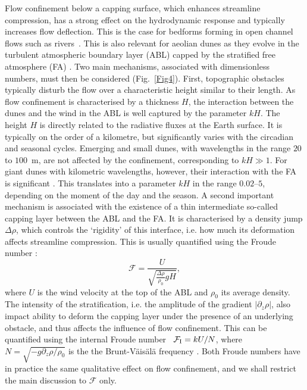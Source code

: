 Flow confinement below a capping surface, which enhances streamline compression, has a strong effect on the hydrodynamic response and typically increases flow deflection. This is the case for bedforms forming in open channel flows such as rivers~\citep{Fourriere2010, Unsworth2018}. This is also relevant for aeolian dunes as they evolve in the turbulent atmospheric boundary layer (ABL) capped by the stratified free atmosphere (FA) \citep{andreotti2009}. Two main mechanisms, associated with dimensionless numbers, must then be considered (Fig.~\ref{Fig4}). First, topographic obstacles typically disturb the flow over a characteristic height similar to their length. As flow confinement is characterised by a thickness $H$, the interaction between the dunes and the wind in the ABL is well captured by the parameter $k H$. The height $H$ is directly related to the radiative fluxes at the Earth surface. It is typically on the order of a kilometre, but significantly varies with the circadian and seasonal cycles. Emerging and small dunes, with wavelengths in the range $20$ to $100$~m, are not affected by the confinement, corresponding to $k H \gg 1$. For giant dunes with kilometric wavelengths, however, their interaction with the FA is significant \citep{andreotti2009}. This translates into a parameter $kH$ in the range $0.02$--$5$, depending on the moment of the day and the season. A second important mechanism is associated with the existence of a thin intermediate so-called capping layer between the ABL and the FA. It is characterised by a density jump $\Delta\rho$, which controls the `rigidity' of this interface, i.e. how much its deformation affects streamline compression. This is usually quantified using the Froude number \citep{Vosper2004, Stull2006, Sheridan2006, Hunt2006, Jiang2014}:
%
\begin{equation}
\mathcal{F} = \displaystyle\frac{U}{\sqrt{\displaystyle\frac{\Delta\rho}{\rho_{0}}gH}},
\label{FroudeNumber}
\end{equation}
%
where $U$ is the wind velocity at the top of the ABL and $\rho_{0}$ its average density. The intensity of the stratification, i.e. the amplitude of the gradient $\left | \partial_z \rho \right|$, also impact ability to deform the capping layer under the presence of an underlying obstacle, and thus affects the influence of flow confinement. This can be quantified using the internal Froude number~\citep{Vosper2004, Stull2006, Sheridan2006, Hunt2006, Jiang2014} $\mathcal{F}_{\textup{I}} = k U/N$, where $N = \sqrt{-g \partial_z \rho / \rho_{0}}$ is the the Brunt-V\"ais\"al\"a frequency \citep{Stull1988}. Both Froude numbers have in practice the same qualitative effect on flow confinement, and we shall restrict the main discussion to $\mathcal{F}$ only.

